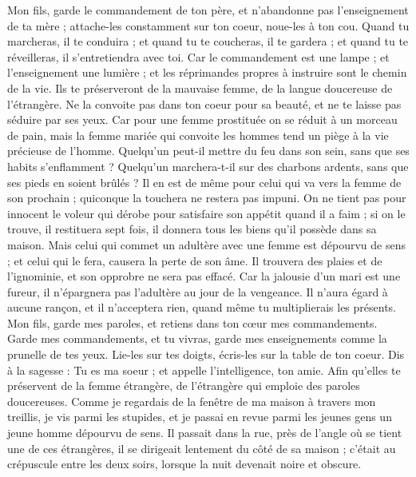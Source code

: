 \begin{multicols}{2}
Mon fils, garde le commandement de ton père, et n'abandonne pas l'enseignement de ta mère ;
attache-les constamment sur ton coeur, noue-les à ton cou.
Quand tu marcheras, il te conduira ; et quand tu te coucheras, il te gardera ; et quand tu te réveilleras, il s'entretiendra avec toi.
Car le commandement est une lampe ; et l'enseignement une lumière ; et les réprimandes propres à instruire sont le chemin de la vie.
Ils te préserveront de la mauvaise femme, de la langue doucereuse de l’étrangère.
Ne la convoite pas dans ton coeur pour sa beauté, et ne te laisse pas séduire par ses yeux.
Car pour une femme prostituée on se réduit à un morceau de pain, mais la femme mariée qui convoite les hommes tend un piège à la vie précieuse de l’homme.
Quelqu'un peut-il mettre du feu dans son sein, sans que ses habits s’enflamment ?
Quelqu'un marchera-t-il sur des charbons ardents, sans que ses pieds en soient brûlés ?
Il en est de même pour celui qui va vers la femme de son prochain ; quiconque la touchera ne restera pas impuni.
On ne tient pas pour innocent le voleur qui dérobe pour satisfaire son appétit quand il a faim ;
si on le trouve, il restituera sept fois, il donnera tous les biens qu'il possède dans sa maison.
Mais celui qui commet un adultère avec une femme est dépourvu de sens ; et celui qui le fera, causera la perte de son âme.
Il trouvera des plaies et de l’ignominie, et son opprobre ne sera pas effacé.
Car la jalousie d’un mari est une fureur, il n'épargnera pas l'adultère au jour de la vengeance.
Il n'aura égard à aucune rançon, et il n'acceptera rien, quand même tu multiplierais les présents.
\TextTitle{[La prostituée]}
\VerseOne{}Mon fils, garde mes paroles, et retiens dans ton cœur mes commandements.
Garde mes commandements, et tu vivras, garde mes enseignements comme la prunelle de tes yeux.
Lie-les sur tes doigts, écris-les sur la table de ton coeur.
Dis à la sagesse : Tu es ma soeur ; et appelle l’intelligence, ton amie.
Afin qu'elles te préservent de la femme étrangère, de l’étrangère qui emploie des paroles doucereuses.
Comme je regardais de la fenêtre de ma maison à travers mon treillis,
je vis parmi les stupides, et je passai en revue parmi les jeunes gens un jeune homme dépourvu de sens.
Il passait dans la rue, près de l’angle où se tient une de ces étrangères, il se dirigeait lentement du côté de sa maison ;
c’était au crépuscule entre les deux soirs, lorsque la nuit devenait noire et obscure.

\end{multicols}
